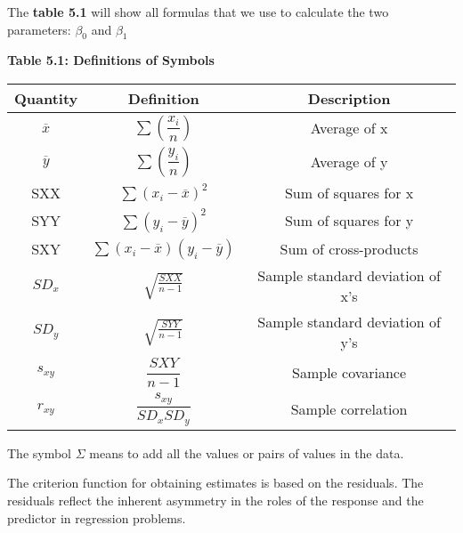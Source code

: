 \documentclass{article}
\begin{document}
    The \textbf{table 5.1} will show all formulas that we use to calculate the two parameters: ${\beta_{0}}$ and ${\beta_{1}}$
    
    \begin{center}
        \textbf{Table 5.1: Definitions of Symbols}
        \begin{tabular}{|c|c|c|}
            \hline 
            Quantity & Definition & Description\\ 
            \hline 
            $\overline{x}$ & ${\displaystyle \sum \left(\dfrac{x_{i}}{n}\right)}$ & Average of x \\  
            \hline 
            $\overline{y}$ & ${\displaystyle \sum \left(\dfrac{y_{i}}{n}\right)}$ & Average of y \\
            \hline 
            SXX & ${\displaystyle \sum {\left(x_{i} - \overline{x}\right)}^2}$ & Sum of squares for x \\
            \hline 
            SYY & ${\displaystyle \sum {\left(y_{i} - \overline{y}\right)}^2}$ & Sum of squares for y \\
            \hline
            SXY & ${\displaystyle \sum (x_{i} - \overline{x})(y_{i} - \overline{y})}$ & Sum of cross-products \\
            \hline
            ${SD_{x}}$ & ${\sqrt{\frac{SXX}{n - 1}}}$ & Sample standard deviation of x’s \\
            \hline 
            ${SD_{y}}$ & ${\sqrt{\frac{SYY}{n - 1}}}$ & Sample standard deviation of y’s \\
            \hline 
            ${s_{xy}}$ & ${\dfrac{SXY}{n - 1}}$ & Sample covariance \\ 
            \hline 
            ${r_{xy}}$ & ${\dfrac{s_{xy}}{SD_{x} SD_{y}}}$ & Sample correlation \\ 
            \hline
        \end{tabular}
        
        \vspace{\baselineskip}
        The symbol ${\Sigma}$ means to add all the values or pairs of values in the data. 
    \end{center}
    
    The criterion function for obtaining estimates is based on the residuals. The residuals reflect the inherent asymmetry in the roles of the response and the predictor in regression problems.
    
\end{document}
